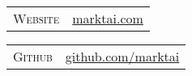 \documentclass[a4paper,10pt]{article}
\begin{document}
\begin{minipage}{0.48\textwidth}
\begin{tabular}{r|l}
 \textsc{Website} & \href{http://www.marktai.com}{marktai.com}\\
\end{tabular}
\end{minipage}%
\begin{minipage}{0.48\textwidth}
\begin{tabular}{r|l}
 \textsc{Github} & \href{https://www.github.com/marktai}{github.com/marktai}\\
\end{tabular}
\end{minipage}%



 
\end{document}
